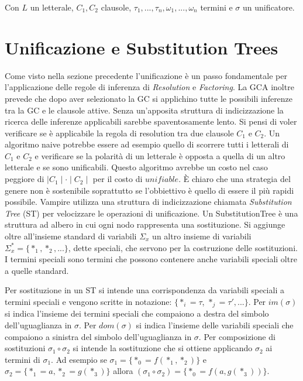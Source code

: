 \documentclass[./main.tex]{subfiles}
\begin{document}
Con $L$ un letterale, $C_1, C_2$ clausole, $\tau_1, ..., \tau_n, \omega_1, ..., \omega_n$ termini e $\sigma$ un unificatore.

\section{Unificazione e Substitution Trees} \label{sec:vampire_unification}
Come visto nella sezione precedente l'unificazione è un passo fondamentale per l'applicazione delle regole di inferenza di 
\textit{Resolution} e \textit{Factoring}. La GCA inoltre prevede che dopo aver selezionato la GC 
si applichino tutte le possibili inferenze tra la GC e le clausole attive. 
Senza un'apposita struttura di indicizzazione la ricerca delle inferenze applicabili sarebbe spaventosamente lento.
Si pensi di voler verificare se è applicabile la regola di resolution tra due clausole $C_1$ e $C_2$.
Un algoritmo naive potrebbe essere ad esempio quello di scorrere tutti i letterali di $C_1$ e $C_2$ e verificare se 
la polarità di un letterale è opposta a quella di un altro letterale e se sono unificabili. 
Questo algoritmo avrebbe un costo nel caso peggiore di $\mid C_1 \mid \cdot \mid C_2 \mid$ per il costo di $unifiable$.
È chiaro che una strategia del genere non è sostenibile soprattutto se l'obbiettivo è quello di essere il più rapidi possibile.
Vampire utilizza una struttura di indicizzazione chiamata \textit{Substitution Tree} (ST) per velocizzare le operazioni di unificazione.
Un SubstitutionTree è una struttura ad albero in cui ogni nodo rappresenta una sostituzione.
Si aggiunge oltre all'insieme standard di variabili $\Sigma_x$ un altro insieme di variabili $\Sigma_x^* = \{*_1, *_2, ...\}$, dette speciali, che servono per la costruzione delle sostituzioni.
I termini speciali sono termini che possono contenere anche variabili speciali oltre a quelle standard.

Per sostituzione in un ST si intende una corrispondenza da variabili speciali a termini speciali e vengono scritte in notazione:
$\{*_i = \tau$, $*_j = \tau', ... \}$. 
Per $im(\sigma)$ si indica l'insieme dei termini speciali che compaiono a destra del simbolo dell'uguaglianza in $\sigma$.
Per $dom(\sigma)$ si indica l'insieme delle variabili speciali che compaiono a sinistra del simbolo dell'uguaglianza in $\sigma$.
Per composizione di sostituzioni $\sigma_1 \circ \sigma_2$ si intende la sostituzione che si ottiene applicando $\sigma_2$ 
ai termini di $\sigma_1$. Ad esempio se $\sigma_1 = \{*_0 = f(*_1, *_2)\}$ e $\sigma_2 = \{*_1 = a, *_2 = g(*_3)\}$ allora
$(\sigma_1 \circ \sigma_2) = \{*_0 = f(a, g(*_3))\}$.
\end{document}
